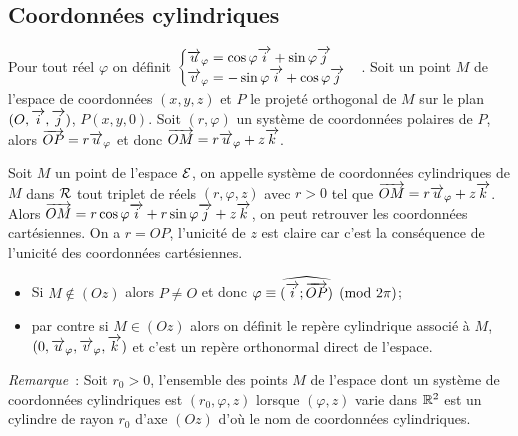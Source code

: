 \subsection{Coordonnées cylindriques}
\label{subsec:coordcyl}
Pour tout réel \(\varphi\) on définit \(\begin{cases}\overrightarrow{u}_\varphi=\cos\varphi\overrightarrow{i}+\sin\varphi\overrightarrow{j}\\ \overrightarrow{v}_\varphi=-\sin\varphi\overrightarrow{i}+\cos\varphi\overrightarrow{j}\end{cases}\). Soit un point \(M\) de l'espace de coordonnées \((x,y,z)\) et \(P\) le projeté orthogonal de \(M\) sur le plan \((O,\overrightarrow{i},\overrightarrow{j})\), \(P(x,y,0)\). Soit \((r,\varphi)\) un système de coordonnées polaires de \(P\), alors \(\overrightarrow{OP}=r\overrightarrow{u}_\varphi\) et donc \(\overrightarrow{OM}=r\overrightarrow{u}_\varphi+z\overrightarrow{k}\).
\begin{defdef}
  Soit \(M\) un point de l'espace \(\mathcal{E}\), on appelle système de coordonnées cylindriques de \(M\) dans \(\mathcal{R}\) tout triplet de réels \((r,\varphi,z)\) avec \(r>0\) tel que \(\overrightarrow{OM}=r\overrightarrow{u}_\varphi+z\overrightarrow{k}\). Alors \(\overrightarrow{OM}=r\cos\varphi\overrightarrow{i}+r\sin\varphi\overrightarrow{j}+z\overrightarrow{k}\), on peut retrouver les coordonnées cartésiennes. On a \(r=OP\), l'unicité de \(z\) est claire car c'est la conséquence de l'unicité des coordonnées cartésiennes. 
\begin{itemize}
\item Si \(M\notin(Oz)\) alors \(P\neq O\) et donc \(\varphi \equiv \widehat{(\overrightarrow{i};\overrightarrow{OP})} \pmod {2\pi}\);
\item par contre si \(M\in(Oz)\) alors on définit le repère cylindrique associé à \(M\), \((0,\overrightarrow{u}_\varphi,\overrightarrow{v}_\varphi,\overrightarrow{k})\) et c'est un repère orthonormal direct de l'espace.
\end{itemize}
\end{defdef}

\emph{Remarque}~: Soit \(r_0>0\), l'ensemble des points \(M\) de l'espace dont un système de coordonnées cylindriques est \((r_0,\varphi,z)\) lorsque \((\varphi,z)\) varie dans \(\mathbb{R}^2\) est un cylindre de rayon \(r_0\) d'axe \((Oz)\) d'où le nom de coordonnées cylindriques.

